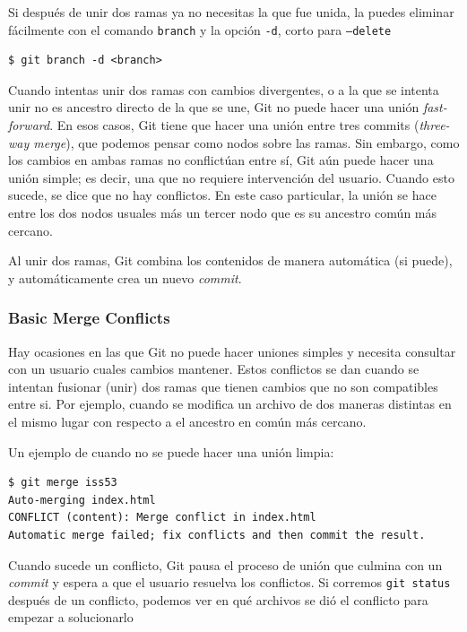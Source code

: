 \documentclass[spanish, 12pt, a4paper]{article}
\begin{document}
Si después de unir dos ramas ya no necesitas la que fue unida, la puedes
eliminar fácilmente con el comando \passthrough{\lstinline!branch!} y la
opción \passthrough{\lstinline!-d!}, corto para
\passthrough{\lstinline!–delete!}

\begin{lstlisting}
$ git branch -d <branch>
\end{lstlisting}

Cuando intentas unir dos ramas con cambios divergentes, o a la que se
intenta unir no es ancestro directo de la que se une, Git no puede hacer
una unión \emph{fast-forward}. En esos casos, Git tiene que hacer una
unión entre tres commits (\emph{three-way merge}), que podemos pensar
como nodos sobre las ramas. Sin embargo, como los cambios en ambas ramas
no conflictúan entre sí, Git aún puede hacer una unión simple; es decir,
una que no requiere intervención del usuario. Cuando esto sucede, se
dice que no hay conflictos. En este caso particular, la unión se hace
entre los dos nodos usuales más un tercer nodo que es su ancestro común
más cercano.

Al unir dos ramas, Git combina los contenidos de manera automática (si
puede), y automáticamente crea un nuevo \emph{commit}.

\subsubsection{Basic Merge Conflicts}

Hay ocasiones en las que Git no puede hacer uniones simples y necesita
consultar con un usuario cuales cambios mantener. Estos conflictos se
dan cuando se intentan fusionar (unir) dos ramas que tienen cambios que
no son compatibles entre si. Por ejemplo, cuando se modifica un archivo
de dos maneras distintas en el mismo lugar con respecto a el ancestro en
común más cercano.

Un ejemplo de cuando no se puede hacer una unión limpia:

\begin{lstlisting}
$ git merge iss53
Auto-merging index.html
CONFLICT (content): Merge conflict in index.html
Automatic merge failed; fix conflicts and then commit the result.
\end{lstlisting}

Cuando sucede un conflicto, Git pausa el proceso de unión que culmina
con un \emph{commit} y espera a que el usuario resuelva los conflictos.
Si corremos \passthrough{\lstinline!git status!} después de un
conflicto, podemos ver en qué archivos se dió el conflicto para empezar
a solucionarlo
\end{document}

